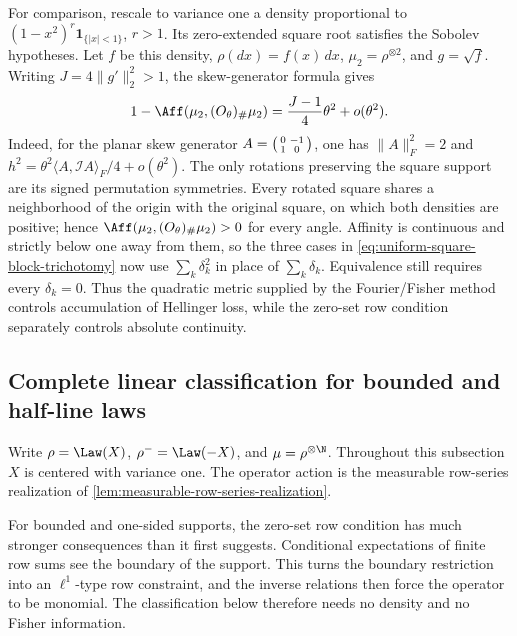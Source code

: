 For comparison, rescale to variance one a density proportional
to \((1-x^2)^r\mathbf1_{\{|x|<1\}}\), \(r>1\).
Its zero-extended square root satisfies the Sobolev hypotheses.
Let \(f\) be this density, \(\rho(dx)=f(x)\,dx\),
\(\mu_2=\rho^{\otimes2}\), and \(g=\sqrt f\).
Writing \(J=4\|g'\|_2^2>1\), the skew-generator formula gives
\begin{equation}
 1-\Aff(\mu_2,(O_\theta)_\#\mu_2)=\frac{J-1}{4}\theta^2+o(\theta^2).
 \label{eq:smooth-boundary-rotation-affinity}
\end{equation}
Indeed, for the planar skew generator
\(A=\begin{psmallmatrix}0&-1\\1&0\end{psmallmatrix}\), one has
\(\|A\|_F^2=2\) and
\(h^2=\theta^2\langle A,\mathcal I A\rangle_F/4+o(\theta^2)\).
The only rotations preserving the square support are its signed
permutation symmetries.
Every rotated square shares a neighborhood of the origin with the
original square, on which both densities are positive; hence
\(\Aff(\mu_2,(O_\theta)_\#\mu_2)>0\) for every angle.
Affinity is continuous and strictly below one away from them,
so the three cases in \eqref{eq:uniform-square-block-trichotomy}
now use \(\sum_k\delta_k^2\) in place of \(\sum_k\delta_k\).
Equivalence still requires every \(\delta_k=0\).
Thus the quadratic metric supplied by the Fourier/Fisher method controls
accumulation of Hellinger loss, while the zero-set row condition separately
controls absolute continuity.

\subsection{Complete linear classification for bounded and half-line laws}
\label{sec:bounded-and-half-line-classification}

Write \(\rho=\Law(X)\), \(\rho^-=\Law(-X)\), and
\(\mu=\rho^{\otimes\N}\).
Throughout this subsection \(X\) is centered with variance one.
The operator action is the measurable row-series realization of
\cref{lem:measurable-row-series-realization}.

For bounded and one-sided supports, the zero-set row condition has much stronger
consequences than it first suggests.
Conditional expectations of finite row sums see the boundary of the support.
This turns the boundary restriction into an \(\ell^1\)-type row constraint, and
the inverse relations then force the operator to be monomial.
The classification below therefore needs no density and no Fisher
information.


